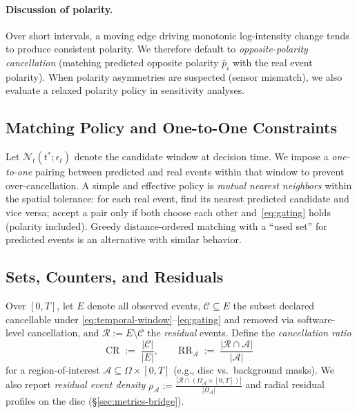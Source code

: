 \paragraph{Discussion of polarity.}
Over short intervals, a moving edge driving monotonic log-intensity change tends to produce consistent polarity. We therefore default to \emph{opposite-polarity cancellation} (matching predicted opposite polarity $\bar p_i$ with the real event polarity). When polarity asymmetries are suspected (sensor mismatch), we also evaluate a relaxed polarity policy in sensitivity analyses.

\subsection{Matching Policy and One-to-One Constraints}
Let $\mathcal{N}_t(t^*;\epsilon_t)$ denote the candidate window at decision time. We impose a \emph{one-to-one} pairing between predicted and real events within that window to prevent over-cancellation. A simple and effective policy is \emph{mutual nearest neighbors} within the spatial tolerance: for each real event, find its nearest predicted candidate and vice versa; accept a pair only if both choose each other and~\eqref{eq:gating} holds (polarity included). Greedy distance-ordered matching with a ``used set'' for predicted events is an alternative with similar behavior.

\subsection{Sets, Counters, and Residuals}
Over $[0,T]$, let $E$ denote all observed events, $\mathcal{C}\subseteq E$ the subset declared cancellable under \eqref{eq:temporal-window}--\eqref{eq:gating} and removed via software-level cancellation, and $\mathcal{R} := E \setminus \mathcal{C}$ the \emph{residual} events. Define the \emph{cancellation ratio}
\begin{equation}
\mathrm{CR} \;:=\; \frac{|\mathcal{C}|}{|E|},
\qquad
\mathrm{RR}_\mathcal{A} \;:=\; \frac{|\mathcal{R}\cap \mathcal{A}|}{|\mathcal{A}|}
\label{eq:cr-rr}
\end{equation}
for a region-of-interest $\mathcal{A}\subseteq \Omega\times[0,T]$ (e.g., disc vs.\ background masks). We also report \emph{residual event density} $\rho_\mathcal{A} := \frac{|\mathcal{R}\cap (\Omega_\mathcal{A}\times[0,T])|}{|\Omega_\mathcal{A}|}$ and radial residual profiles on the disc (\S\ref{sec:metrics-bridge}).

